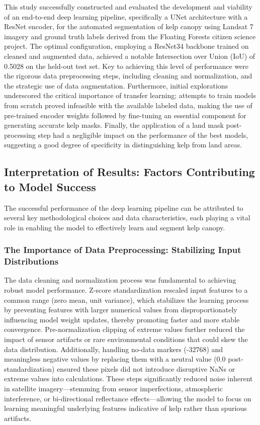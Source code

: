 \documentclass{article}
\begin{document}
This study successfully constructed and evaluated the development and viability of an end-to-end deep learning pipeline, specifically a UNet architecture with a ResNet encoder, for the automated segmentation of kelp canopy using Landsat 7 imagery and ground truth labels derived from the Floating Forests citizen science project. The optimal configuration, employing a ResNet34 backbone trained on cleaned and augmented data, achieved a notable Intersection over Union (IoU) of 0.5028 on the held-out test set. Key to achieving this level of performance were the rigorous data preprocessing steps, including cleaning and normalization, and the strategic use of data augmentation. Furthermore, initial explorations underscored the critical importance of transfer learning; attempts to train models from scratch proved infeasible with the available labeled data, making the use of pre-trained encoder weights followed by fine-tuning an essential component for generating accurate kelp masks. Finally, the application of a land mask post-processing step had a negligible impact on the performance of the best models, suggesting a good degree of specificity in distinguishing kelp from land areas.

\subsection{Interpretation of Results: Factors Contributing to Model Success}

The successful performance of the deep learning pipeline can be attributed to several key methodological choices and data characteristics, each playing a vital role in enabling the model to effectively learn and segment kelp canopy.

\subsubsection{The Importance of Data Preprocessing: Stabilizing Input Distributions}

The data cleaning and normalization process was fundamental to achieving robust model performance. Z-score standardization rescaled input features to a common range (zero mean, unit variance), which stabilizes the learning process by preventing features with larger numerical values from disproportionately influencing model weight updates, thereby promoting faster and more stable convergence. Pre-normalization clipping of extreme values further reduced the impact of sensor artifacts or rare environmental conditions that could skew the data distribution. Additionally, handling no-data markers (-32768) and meaningless negative values by replacing them with a neutral value (0.0 post-standardization) ensured these pixels did not introduce disruptive NaNs or extreme values into calculations. These steps significantly reduced noise inherent in satellite imagery—stemming from sensor imperfections, atmospheric interference, or bi-directional reflectance effects—allowing the model to focus on learning meaningful underlying features indicative of kelp rather than spurious artifacts.
\end{document}
